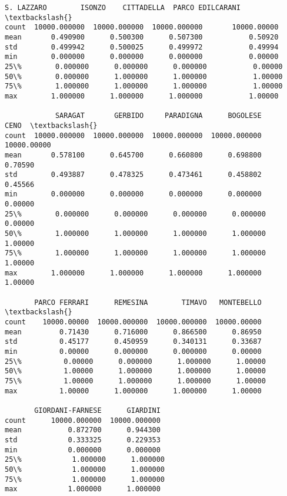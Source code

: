 \documentclass[11pt]{article}
\begin{document}
\begin{tcolorbox}[breakable, size=fbox, boxrule=.5pt, pad at break*=1mm, opacityfill=0]
\begin{Verbatim}[commandchars=\\\{\}]
         S. LAZZARO        ISONZO    CITTADELLA  PARCO EDILCARANI  \textbackslash{}
count  10000.000000  10000.000000  10000.000000       10000.00000
mean       0.490900      0.500300      0.507300           0.50920
std        0.499942      0.500025      0.499972           0.49994
min        0.000000      0.000000      0.000000           0.00000
25\%        0.000000      0.000000      0.000000           0.00000
50\%        0.000000      1.000000      1.000000           1.00000
75\%        1.000000      1.000000      1.000000           1.00000
max        1.000000      1.000000      1.000000           1.00000

            SARAGAT       GERBIDO     PARADIGNA      BOGOLESE         CENO  \textbackslash{}
count  10000.000000  10000.000000  10000.000000  10000.000000  10000.00000
mean       0.578100      0.645700      0.660800      0.698800      0.70590
std        0.493887      0.478325      0.473461      0.458802      0.45566
min        0.000000      0.000000      0.000000      0.000000      0.00000
25\%        0.000000      0.000000      0.000000      0.000000      0.00000
50\%        1.000000      1.000000      1.000000      1.000000      1.00000
75\%        1.000000      1.000000      1.000000      1.000000      1.00000
max        1.000000      1.000000      1.000000      1.000000      1.00000

       PARCO FERRARI      REMESINA        TIMAVO   MONTEBELLO  \textbackslash{}
count    10000.00000  10000.000000  10000.000000  10000.00000
mean         0.71430      0.716000      0.866500      0.86950
std          0.45177      0.450959      0.340131      0.33687
min          0.00000      0.000000      0.000000      0.00000
25\%          0.00000      0.000000      1.000000      1.00000
50\%          1.00000      1.000000      1.000000      1.00000
75\%          1.00000      1.000000      1.000000      1.00000
max          1.00000      1.000000      1.000000      1.00000

       GIORDANI-FARNESE      GIARDINI
count      10000.000000  10000.000000
mean           0.872700      0.944300
std            0.333325      0.229353
min            0.000000      0.000000
25\%            1.000000      1.000000
50\%            1.000000      1.000000
75\%            1.000000      1.000000
max            1.000000      1.000000
\end{Verbatim}
\end{tcolorbox}
        
\end{document}
